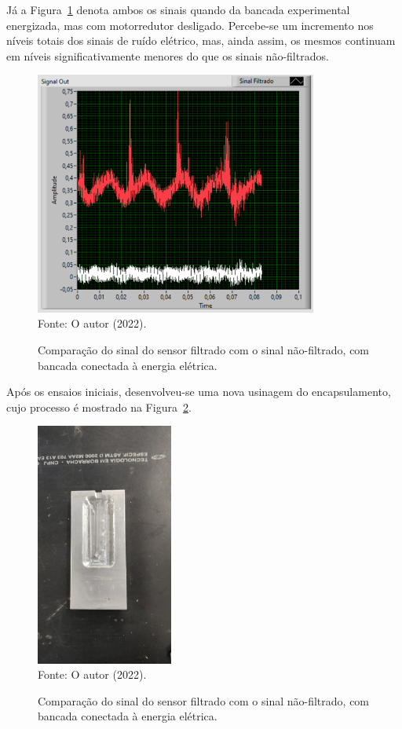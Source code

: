 \documentclass[
	12pt,				
	oneside,			
	a4paper,			
	english,			
	brazil,			
	]{abntex2ppgsi}
\begin{document}
Já a Figura~\ref{sinal_filtrado_maquina_ligada_tomada} denota ambos os sinais quando da bancada experimental energizada, mas com motorredutor desligado. Percebe-se um incremento nos níveis totais dos sinais de ruído elétrico, mas, ainda assim, os mesmos continuam em níveis significativamente menores do que os sinais não-filtrados.

\begin{figure}[H]
\centering
\caption {Comparação do sinal do sensor filtrado com o sinal não-filtrado, com bancada conectada à energia elétrica.}
\includegraphics[width=\textwidth,height=80mm,keepaspectratio]{GraficosAnalise/sinal_filtrado_maquina_ligada_tomada} \\
Fonte: O autor (2022).
\label{sinal_filtrado_maquina_ligada_tomada}
\end{figure} 

Após os ensaios iniciais, desenvolveu-se uma nova usinagem do encapsulamento, cujo processo é mostrado na Figura~\ref{encapsulamento_novo_usinagem}.

\begin{figure}[H]
\centering
\caption {Comparação do sinal do sensor filtrado com o sinal não-filtrado, com bancada conectada à energia elétrica.}
\includegraphics[width=\textwidth,height=80mm,keepaspectratio]{encapsulamento_novo_usinagem} \\
Fonte: O autor (2022).
\label{encapsulamento_novo_usinagem}
\end{figure} 
\end{document}

